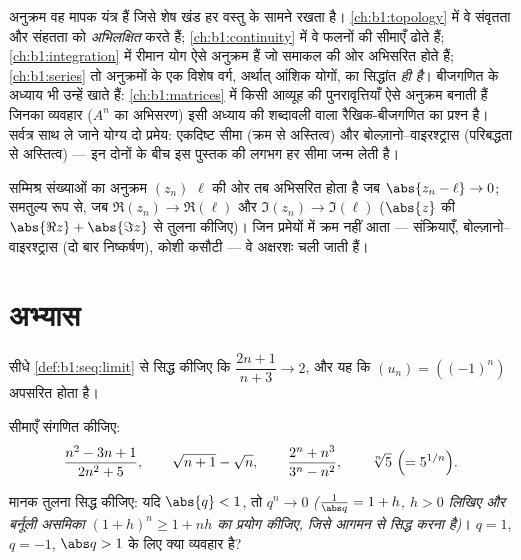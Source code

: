 \begin{remark}[इस खंड के भीतर आगे की दृष्टि]
अनुक्रम वह मापक यंत्र हैं जिसे शेष खंड हर वस्तु के सामने रखता है।
\cref{ch:b1:topology} में वे संवृतता और संहतता को \emph{अभिलक्षित} करते हैं;
\cref{ch:b1:continuity} में वे फलनों की सीमाएँ ढोते हैं;
\cref{ch:b1:integration} में रीमान योग ऐसे अनुक्रम हैं जो समाकल की ओर
अभिसरित होते हैं; \cref{ch:b1:series} तो अनुक्रमों के एक विशेष वर्ग, अर्थात्
आंशिक योगों, का सिद्धांत \emph{ही है}। बीजगणित के अध्याय भी उन्हें खाते हैं:
\cref{ch:b1:matrices} में किसी आव्यूह की पुनरावृत्तियाँ ऐसे अनुक्रम बनाती
हैं जिनका व्यवहार ($A^n$ का अभिसरण) इसी अध्याय की शब्दावली वाला
रैखिक-बीजगणित का प्रश्न है। सर्वत्र साथ ले जाने योग्य दो प्रमेय: एकदिष्ट
सीमा (क्रम से अस्तित्व) और बोल्ज़ानो--वाइरश्ट्रास (परिबद्धता से अस्तित्व)
--- इन दोनों के बीच इस पुस्तक की लगभग हर सीमा जन्म लेती है।
\end{remark}

\begin{remark}[सम्मिश्र अनुक्रम]
सम्मिश्र संख्याओं का अनुक्रम $(z_n)$ $\ell$ की ओर तब अभिसरित होता है जब
$\abs{z_n - \ell} \to 0$; समतुल्य रूप से, जब $\Re(z_n) \to \Re(\ell)$ और
$\Im(z_n) \to \Im(\ell)$ ($\abs{z}$ की $\abs{\Re z} + \abs{\Im z}$ से तुलना
कीजिए)। जिन प्रमेयों में क्रम नहीं आता --- संक्रियाएँ,
बोल्ज़ानो--वाइरश्ट्रास (दो बार निष्कर्षण), कोशी कसौटी --- वे अक्षरशः चली
जाती हैं।
\end{remark}

\section{अभ्यास}

\begin{exercise}[$\star$]\label{exo:b1:seq:1}
सीधे \cref{def:b1:seq:limit} से सिद्ध कीजिए कि $\dfrac{2n+1}{n+3} \to 2$, और
यह कि $(u_n) = ((-1)^n)$ अपसरित होता है।
\end{exercise}

\begin{exercise}[$\star$]\label{exo:b1:seq:2}
सीमाएँ संगणित कीजिए:
\[
\frac{n^2 - 3n + 1}{2n^2 + 5},
\qquad
\sqrt{n+1} - \sqrt n,
\qquad
\frac{2^n + n^3}{3^n - n^2},
\qquad
\sqrt[n]{5}\ \Bigl(= 5^{1/n}\Bigr).
\]
\end{exercise}

\begin{exercise}[$\star$]\label{exo:b1:seq:3}
मानक तुलना सिद्ध कीजिए: यदि $\abs{q} < 1$, तो $q^n \to 0$
\emph{($\frac{1}{\abs q} = 1 + h$, $h > 0$ लिखिए और बर्नूली असमिका $(1+h)^n
\geq 1 + nh$ का प्रयोग कीजिए, जिसे आगमन से सिद्ध करना है)}। $q = 1$, $q =
-1$, $\abs q > 1$ के लिए क्या व्यवहार है?
\end{exercise}

